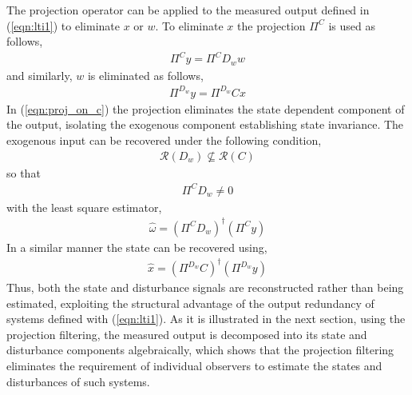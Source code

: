 The projection operator can be applied to the measured output defined in (\ref{eqn:lti1}) to eliminate $x$ or $w$. To eliminate $x$ the projection $\Pi^C$ is used as follows,
\begin{gather}
    \Pi^C y=\Pi^C D_w w\label{eqn:proj_on_c}
\end{gather}
and similarly, $w$ is eliminated as follows,
\begin{gather}
    \Pi^{D_w} y=\Pi^{D_w}C x
\end{gather}
In (\ref{eqn:proj_on_c}) the projection eliminates the state dependent component of the output, isolating the exogenous component establishing state invariance. The exogenous input can be recovered under the following condition,
\begin{gather}
    \mathcal{R}(D_w) \not\subseteq \mathcal{R}(C)
\end{gather}
so that 
\begin{gather}
    \Pi^C D_w \neq 0
\end{gather}
with the least square estimator,
\begin{gather}
    \hat{\omega}=(\Pi^C D_w)^\dagger(\Pi^C y)\label{eqn:filtering_w}
\end{gather}
In a similar manner the state can be recovered using,
\begin{gather}
    \hat{x}=(\Pi^{D_w}C)^\dagger(\Pi^{D_w} y)\label{eqn:filtering_x}
\end{gather}
Thus, both the state and disturbance signals are reconstructed rather than being estimated, exploiting the structural advantage of the output redundancy of systems defined with (\ref{eqn:lti1}). As it is illustrated in the next section, using the projection filtering, the measured output is decomposed into its state and disturbance components algebraically, which shows that the projection filtering eliminates the requirement of individual observers to estimate the states and disturbances of such systems.
